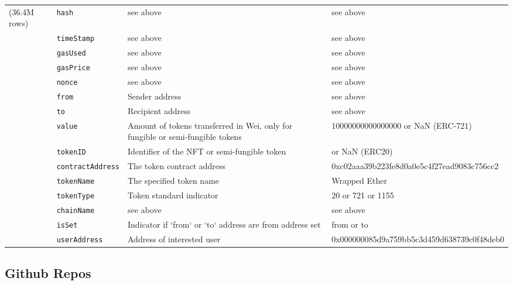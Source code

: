 \documentclass[12pt,a4paper,titlepage,oneside,english]{article}
\begin{document}
\begin{table}[h!]
\begin{tabular}{ll p{4cm} p{5.5cm}}
    (36.4M rows) & \texttt{hash} & see above & see above \\
     & \texttt{timeStamp} & see above & see above\\
     & \texttt{gasUsed} & see above &  see above\\
     & \texttt{gasPrice} & see above & see above \\
     & \texttt{nonce} &  see above & see above \\
     & \texttt{from} &  Sender address & see above \\
     & \texttt{to} &  Recipient address & see above \\
     & \texttt{value} & Amount of tokens transferred in Wei, only for fungible or semi-fungible tokens & 10000000000000000 or NaN (ERC-721) \\
     & \texttt{tokenID} &  Identifier of the NFT or semi-fungible token &  or NaN (ERC20) \\
     & \texttt{contractAddress} & The token contract address &  0xc02aaa39b223fe8d0a0e5c4f27ead9083c756cc2 \\
     & \texttt{tokenName} & The specified token name &  Wrapped Ether\\
     & \texttt{tokenType} & Token standard indicator &  20 or 721 or 1155\\
     & \texttt{chainName} & see above &  see above \\
     & \texttt{isSet} & Indicator if `from` or `to` address are from address set &  from or to \\
     & \texttt{userAddress} & Address of interested user & 0x000000085d9a759bb5c3d459d638739c0f48deb0\\
    \hline
  \end{tabular}
\end{table}

\subsection{Github Repos}
\end{document}
